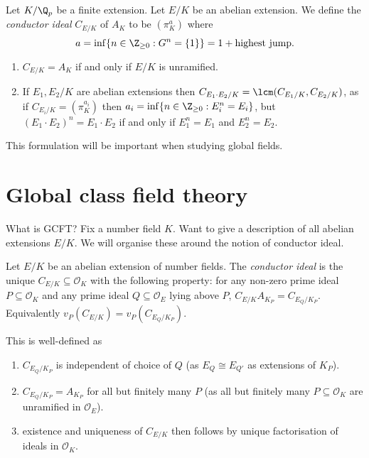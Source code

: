 \documentclass[a4paper]{article}
\renewcommand*{\O}{\mathcal{O}}
\begin{document}
\begin{definition}
  Let \(K/\Q_p\) be a finite extension. Let \(E/K\) be an abelian extension. We define the \emph{conductor ideal} \(C_{E/K}\) of \(A_K\) to be \((\pi_K^a)\) where
  \[
    a = \inf \{n \in \Z_{\geq 0}: G^n = \{1\}\} = 1 + \text{highest jump}.
  \]
\end{definition}

\begin{proposition}\leavevmode
  \begin{enumerate}
  \item \(C_{E/K} = A_K\) if and only if \(E/K\) is unramified.
  \item If \(E_1, E_2/K\) are abelian extensions then \(C_{E_1 \cdot E_2/K} = \lcm(C_{E_1/K}, C_{E_2/K})\), as if \(C_{E_i/K} = (\pi_K^{a_i})\) then \(a_i = \inf \{n \in \Z_{\geq 0}: E^n_i = E_i\}\), but \((E_1 \cdot E_2)^n = E_1 \cdot E_2\) if and only if \(E_1^n = E_1\) and \(E_2^n = E_2\).
  \end{enumerate}
\end{proposition}

This formulation will be important when studying global fields.

\section{Global class field theory}

What is GCFT? Fix a number field \(K\). Want to give a description of all abelian extensions \(E/K\). We will organise these around the notion of conductor ideal.

\begin{definition}
  Let \(E/K\) be an abelian extension of number fields. The \emph{conductor ideal} is the unique \(C_{E/K} \subseteq \O_K\) with the following property: for any non-zero prime ideal \(P \subseteq \O_K\) and any prime ideal \(Q \subseteq \O_E\) lying above \(P\), \(C_{E/K} A_{K_P} = C_{E_Q/K_P}\). Equivalently \(v_P(C_{E/K}) = v_P(C_{E_Q/K_P})\).
\end{definition}

This is well-defined as
\begin{enumerate}
\item \(C_{E_Q/K_P}\) is independent of choice of \(Q\) (as \(E_Q \cong E_{Q'}\) as extensions of \(K_P\)).
\item \(C_{E_Q/K_P} = A_{K_P}\) for all but finitely many \(P\) (as all but finitely many \(P \subseteq \O_K\) are unramified in \(\O_E\)).
\item existence and uniqueness of \(C_{E/K}\) then follows by unique factorisation of ideals in \(\O_K\).
\end{enumerate}
\end{document}

